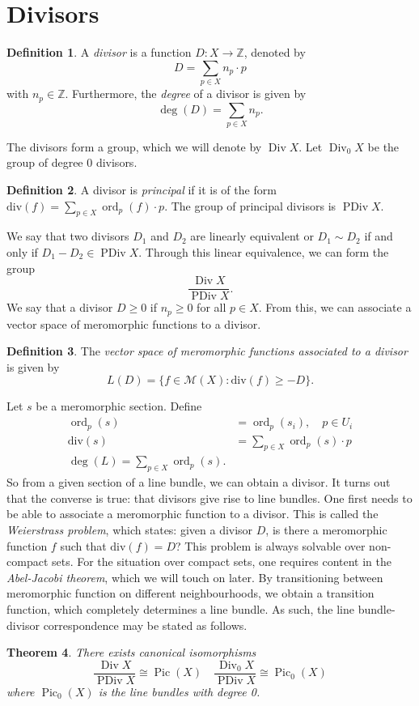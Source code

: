\documentclass[10pt, a4paper]{article}
\theoremstyle{plain}
\newtheorem{thrm}{Theorem}[section]
\theoremstyle{definition}
\newtheorem{defn}[thrm]{Definition}
\DeclareMathOperator{\Div}{Div}
\renewcommand{\div}{\text{div}}
\DeclareMathOperator{\Pic}{Pic}
\DeclareMathOperator{\ord}{ord}
\DeclareMathOperator{\PDiv}{PDiv}
\begin{document}
\section{Divisors}
\begin{defn} A \emph{divisor} is a function $D: X \rightarrow \mathbb{Z}$, denoted by 
$$D = \sum_{p \in X} n_p \cdot p$$
with $n_p \in \mathbb{Z}$. Furthermore, the \emph{degree} of a divisor is given by
$$\deg(D) = \sum_{p\in X} n_p.$$
\end{defn}
The divisors form a group, which we will denote by $\Div X$. Let $\Div_0 X$ be the group of degree 0 divisors. 
\begin{defn} A divisor is \emph{principal} if it is of the form $\div(f) = \sum_{p \in X} \ord_p(f) \cdot p$. The group of principal divisors is $\PDiv X$. 
\end{defn}
We say that two divisors $D_1$ and $D_2$ are linearly equivalent or $D_1 \sim D_2$ if and only if $D_1 - D_2 \in \PDiv X$. Through this linear equivalence, we can form the group
$$\frac{\Div X}{\PDiv X}.$$
We say that a divisor $D \geq 0$ if $n_p \geq 0$ for all $p \in X$. From this, we can associate a vector space of meromorphic functions to a divisor. 
\begin{defn} 
The \emph{vector space of meromorphic functions associated to a divisor} is given by 
$$L(D) = \{f \in \mathcal{M}(X) : \div(f) \geq -D\}.$$
\end{defn} 
Let $s$ be a meromorphic section. Define 
\begin{align*}
\ord_p(s) &= \ord_p(s_i), \quad p \in U_i \\
\div(s) &= \sum_{p \in X} \ord_p(s) \cdot p \\
\deg(L) = \sum_{p \in X} \ord_p(s).
\end{align*}
So from a given section of a line bundle, we can obtain a divisor. It turns out that the converse is true: that divisors give rise to line bundles. One first needs to be able to associate a meromorphic function to a divisor. This is called the \emph{Weierstrass problem}, which states: given a divisor $D$, is there a meromorphic function $f$ such that $\div(f) = D$? This problem is always solvable over non-compact sets. For the situation over compact sets, one requires content in the \emph{Abel-Jacobi theorem}, which we will touch on later. By transitioning between meromorphic function on different neighbourhoods, we obtain a transition function, which completely determines a line bundle. As such, the line bundle-divisor correspondence may be stated as follows. 
\begin{thrm}
There exists canonical isomorphisms 
$$\frac{\Div X}{\PDiv X} \cong \Pic(X) \quad \frac{\Div_0 X}{\PDiv X} \cong \Pic_0(X)$$
where $\Pic_0(X)$ is the line bundles with degree 0. 
\end{thrm}
\end{document}
